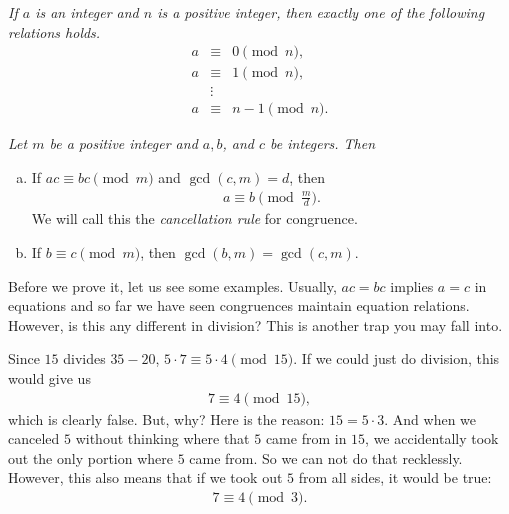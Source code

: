 \documentclass{subfile}
\begin{document}
	
	\begin{proposition}\slshape
		If $a$ is an integer and $n$ is a positive integer, then exactly one of the following relations holds.
			\begin{eqnarray*}
				a &\equiv& 0 \pmod n,\\
				a &\equiv& 1 \pmod n,\\
				  &\vdots&\\
				a &\equiv& n-1 \pmod{n}.
			\end{eqnarray*}
	\end{proposition}
	
	
	\begin{theorem}\slshape
		Let $m$ be a positive integer and $a, b$, and $c$ be integers. Then
		\begin{enumerate}[(a)]
			\item If $ac \equiv bc \pmod m$ and $\gcd(c,m)=d$, then 
				\begin{align*}
					 a \equiv b \pmod{\frac{m}{d}}. 
				 \end{align*}
			We will call this the \textit{cancellation rule} for congruence.
			\item If $b \equiv c \pmod m$, then $\gcd(b,m)=\gcd(c,m)$.
		\end{enumerate}
	\end{theorem}
Before we prove it, let us see some examples. Usually, $ac=bc$ implies $a=c$ in equations and so far we have seen congruences maintain equation relations. However, is this any different in division? This is another trap you may fall into.

Since $15$ divides $35-20$, $5\cdot7\equiv5\cdot4\pmod{15}$. If we could just do division, this would give us
	\begin{align*}
		7\equiv4\pmod{15},
	\end{align*}
which is clearly false. But, why? Here is the reason: $15=5\cdot3$. And when we canceled $5$ without thinking where that $5$ came from in $15$, we accidentally took out the only portion where $5$ came from. So we can not do that recklessly. However, this also means that if we took out $5$ from all sides, it would be true:
	\begin{align*}
		7\equiv4\pmod{3}.
	\end{align*}
\end{document}
